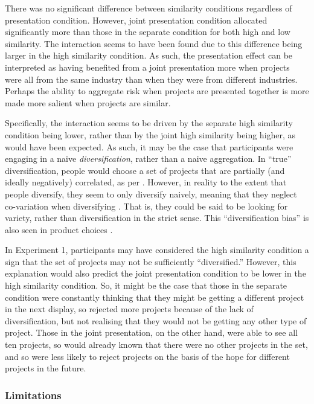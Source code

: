 \documentclass[a4paper, nobind, dvipsnames]{templates/ociamthesis}
\theoremstyle{definition}
\theoremstyle{definition}
\theoremstyle{definition}
\theoremstyle{definition}
\theoremstyle{remark}
\begin{document}
There was no significant difference between similarity conditions regardless of
presentation condition. However, joint presentation condition allocated
significantly more than those in the separate condition for both high and low
similarity. The interaction seems to have been found due to this difference
being larger in the high similarity condition. As such, the presentation effect
can be interpreted as having benefited from a joint presentation more when
projects were all from the same industry than when they were from different
industries. Perhaps the ability to aggregate risk when projects are presented
together is more made more salient when projects are similar.

Specifically, the interaction seems to be driven by the separate high similarity
condition being lower, rather than by the joint high similarity being higher, as
would have been expected. As such, it may be the case that participants were
engaging in a naive \emph{diversification}, rather than a naive aggregation. In
``true'' diversification, people would choose a set of projects that are partially
(and ideally negatively) correlated, as per \textcite{markowitz1952}. However, in reality
to the extent that people diversify, they seem to only diversify naively,
meaning that they neglect co-variation when diversifying \autocite[e.g.,][]{hedesstrom2006}. That is, they could be said to be looking for variety, rather
than diversification in the strict sense. This ``diversification bias'' is also
seen in product choices \autocite{read1995}.

In Experiment 1, participants may have considered the high similarity condition
a sign that the set of projects may not be sufficiently ``diversified.'' However,
this explanation would also predict the joint presentation condition to be lower
in the high similarity condition. So, it might be the case that those in the
separate condition were constantly thinking that they might be getting a
different project in the next display, so rejected more projects because of the
lack of diversification, but not realising that they would not be getting any
other type of project. Those in the joint presentation, on the other hand, were
able to see all ten projects, so would already known that there were no other
projects in the set, and so were less likely to reject projects on the basis of
the hope for different projects in the future.

\hypertarget{limitations}{%
\subsubsection{Limitations}\label{limitations}}
\end{document}
